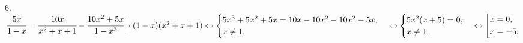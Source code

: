 6. $\cfrac{5x}{1-x}=\cfrac{10x}{x^2+x+1}-\cfrac{10x^2+5x}{1-x^3}\Big|\cdot (1-x)(x^2+x+1)\Leftrightarrow
\begin{cases}
5x^3+5x^2+5x=10x-10x^2-10x^2-5x,\\
x\neq1.\end{cases}\Leftrightarrow\begin{cases}
5x^2(x+5)=0,\\
x\neq1.\end{cases}\Leftrightarrow \left[
\begin{gathered}
x=0, \hfill
\\
x=-5. \hfill
\\
\end{gathered}
\right.\hfill$\\
